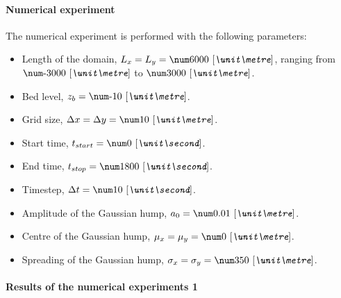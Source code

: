 \paragraph*{Numerical experiment}
The numerical experiment is performed with the following parameters:
\begin{itemize}
    \item Length of the domain, $L_x = L_y = \bqty{6000}{\metre}$, ranging from $\bqty{-3000}{\metre}$ to $\bqty{3000}{\metre}$.
    \item Bed level, $z_b = \bqty{-10}{\metre}$.
    \item Grid size, $\Dx = \Dy = \bqty{10}{\metre}$.
    \item Start time, $t_{start} = \bqty{0}{\second}$.
    \item End time, $t_{stop} = \bqty{1800}{\second}$.
    \item Timestep, $\Dt = \bqty{10}{\second}$.
    \item Amplitude of the Gaussian hump, $a_0 = \bqty{0.01}{\metre}$.
    \item Centre of the Gaussian hump, $\mu_x = \mu_y = \bqty{0}{\metre}$.
    \item Spreading of the Gaussian hump, $\sigma_x = \sigma_y = \bqty{350}{\metre}$.
\end{itemize}

\paragraph*{Results of the numerical experiments 1}
\notyet
